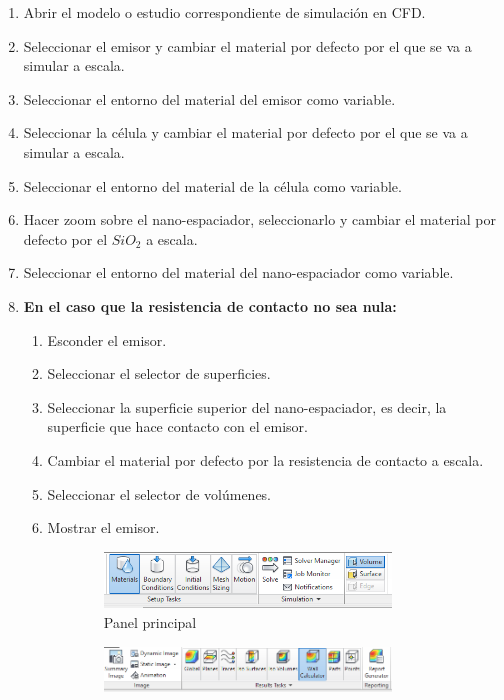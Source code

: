 \begin{enumerate}
	\item Abrir el modelo o estudio correspondiente de simulación en CFD.
	\item Seleccionar el emisor y cambiar el material por defecto por el que se va a simular a escala.
	\item Seleccionar el entorno del material del emisor como variable.
	\item Seleccionar la célula y cambiar el material por defecto por el que se va a simular a escala.
	\item Seleccionar el entorno del material de la célula como variable.
	\item Hacer zoom sobre el nano-espaciador, seleccionarlo y cambiar el material por defecto por el $SiO_2$ a escala.
	\item Seleccionar el entorno del material del nano-espaciador como variable.
	\item \textbf{En el caso que la resistencia de contacto no sea nula:}
	\begin{enumerate}
		\item Esconder el emisor.
		\item Seleccionar el selector de superficies.
		\item Seleccionar la superficie superior del nano-espaciador, es decir, la superficie que hace contacto con el emisor.
		\item Cambiar el material por defecto por la resistencia de contacto a escala.
		\item Seleccionar el selector de volúmenes.
		\item Mostrar el emisor.
	\end{enumerate}
	\begin{figure}[H]
	\centering
	\begin{subfigure}[b]{0.48\textwidth}
		\centering
			\includegraphics[width=0.9\textwidth]{figuras/Procedimiento_Simulaciones/Conduccion/paneles.png}
		\caption{Panel principal}
		\label{fig:paneles}
		\end{subfigure}
		\hfill
		\begin{subfigure}[b]{0.48\textwidth}
			\centering
			\includegraphics[width=0.9\textwidth]{figuras/Procedimiento_Simulaciones/Conduccion/paneles_resultados.png}

\end{subfigure}
\end{figure}
\end{enumerate}

